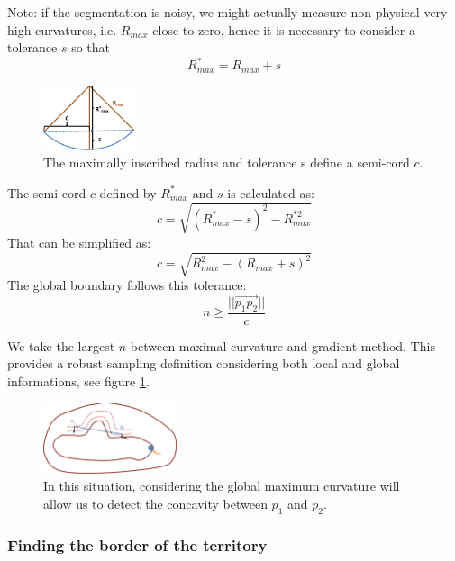 \documentclass[11pt,a4paper]{article}
\begin{document}
Note: if the segmentation is noisy, we might actually measure non-physical very high curvatures, i.e. $R_{max}$ close to zero, hence it is necessary to consider a tolerance $s$ so that 
\begin{equation}
R_{max}^* = R_{max} + s
\end{equation}

\begin{figure}[h!]
			\centering
			\includegraphics[width=0.25\textwidth]{Drawings/CurvatureTolerance.png}
			\caption{The maximally inscribed radius and tolerance s define a semi-cord $c$.}
\end{figure}

The semi-cord $c$ defined by $R_{max}^*$ and $s$ is calculated as:
\begin{equation}
c = \sqrt{(R_{max}^*-s)^2 - R_{max}^{*2}}
\end{equation} 
That can be simplified as:
\begin{equation}
c = \sqrt{R_{max}^2 - (R_{max} + s)^2}
\end{equation}
The global boundary follows this tolerance:
\begin{equation}
n \geq \frac{||\overset{\rightarrow}{p_1p_2}||}{c}
\end{equation}

We take the largest $n$ between maximal curvature and gradient method. This provides a robust sampling definition considering both local and global informations, see figure \ref{test sampling}.
\begin{figure}[h!]
			\label{test sampling}
			\centering
			\includegraphics[width=0.35\textwidth]{Drawings/CurvatureTestExample2.png}
			\caption{In this situation, considering the global maximum curvature will allow us to detect the concavity between $p_1$ and $p_2$.}
\end{figure}

\subsubsection{Finding the border of the territory}
\end{document}
